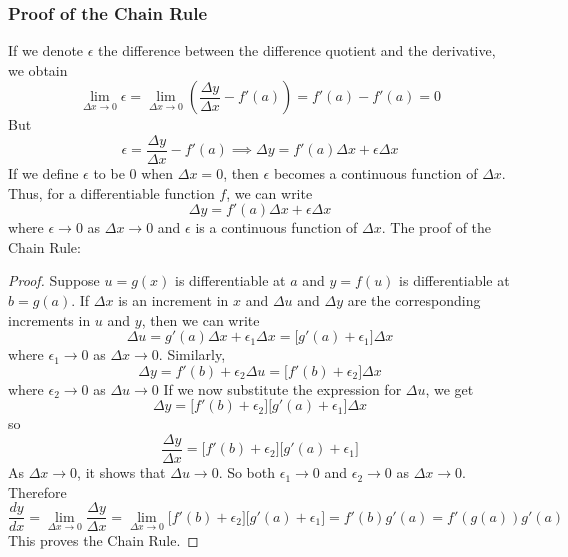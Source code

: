 \subsubsection*{Proof of the Chain Rule}
If we denote \(\epsilon\) the difference between the difference quotient and
the derivative, we obtain
\[\lim_{\Delta x\to 0}\epsilon
=\lim_{\Delta x\to 0}\left(\frac{\Delta y}{\Delta x}-f'(a)\right)
=f'(a)-f'(a)=0\]
But
\[\epsilon=\frac{\Delta y}{\Delta x}-f'(a)
\implies \Delta y=f'(a)\Delta x+\epsilon\Delta x\]
If we define \(\epsilon\) to be 0 when \(\Delta x=0\), then \(\epsilon\)
becomes a continuous function of \(\Delta x\).
Thus, for a differentiable function \(f\), we can write
\[\Delta y=f'(a)\Delta x+\epsilon\Delta x\]
where \(\epsilon\to 0\) as \(\Delta x\to 0\) and \(\epsilon\) is a continuous
function of \(\Delta x\).
The proof of the Chain Rule:
\begin{proof}
    Suppose \(u=g(x)\) is differentiable at \(a\) and \(y=f(u)\) is
    differentiable at \(b=g(a)\).
    If \(\Delta x\) is an increment in \(x\) and \(\Delta u\) and \(\Delta y\)
    are the corresponding increments in \(u\) and \(y\), then we can write
    \[\Delta u=g'(a)\Delta x+\epsilon_1\Delta x
    =\big[g'(a)+\epsilon_1\big]\Delta x\]
    where \(\epsilon_1\to 0\) as \(\Delta x\to 0\).
    Similarly,
    \[\Delta y=f'(b)+\epsilon_2\Delta u=\big[f'(b)+\epsilon_2\big]\Delta x\]
    where \(\epsilon_2\to 0\) as \(\Delta u\to 0\)
    If we now substitute the expression for \(\Delta u\), we get
    \[\Delta y=\big[f'(b)+\epsilon_2\big]\big[g'(a)+\epsilon_1\big]\Delta x\]
    so
    \[\frac{\Delta y}{\Delta x}
    =\big[f'(b)+\epsilon_2\big]\big[g'(a)+\epsilon_1\big]\]
    As \(\Delta x\to 0\), it shows that \(\Delta u\to 0\).
    So both \(\epsilon_1\to 0\) and \(\epsilon_2\to 0\) as \(\Delta x\to 0\).
    Therefore
    \[\frac{dy}{dx}=\lim_{\Delta x\to 0}\frac{\Delta y}{\Delta x}
    =\lim_{\Delta x\to 0}\big[f'(b)+\epsilon_2\big]\big[g'(a)+\epsilon_1\big]
    =f'(b)g'(a)=f'(g(a))g'(a)\]
    This proves the Chain Rule.
\end{proof}